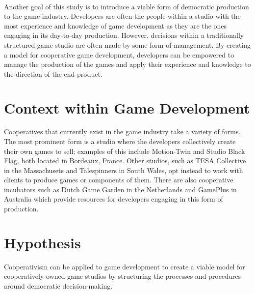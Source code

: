 \paragraph{} Another goal of this study is to introduce a viable form of democratic production to the game industry. Developers are often the people within a studio with the most experience and knowledge of game development as they are the ones engaging in its day-to-day production. However, decisions within a traditionally structured game studio are often made by some form of management. By creating a model for cooperative game development, developers can be empowered to manage the production of the games and apply their experience and knowledge to the direction of the end product.

\section{Context within Game Development}

\paragraph{} Cooperatives that currently exist in the game industry take a variety of forms. The most prominent form is a studio where the developers collectively create their own games to sell; examples of this include Motion-Twin and Studio Black Flag, both located in Bordeaux, France. Other studios, such as TESA Collective in the Massachusets and Talespinners in South Wales, opt instead to work with clients to produce games or components of them. There are also cooperative incubators such as Dutch Game Garden in the Netherlands and GamePlus in Australia which provide resources for developers engaging in this form of production.

\section{Hypothesis}

\paragraph{} Cooperativism can be applied to game development to create a viable model for cooperatively-owned game studios by structuring the processes and procedures around democratic decision-making.